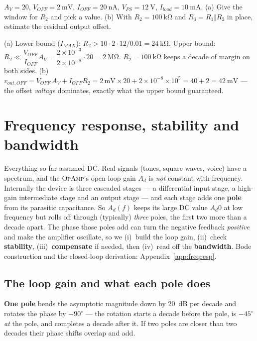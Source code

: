 \documentclass[11pt,a4paper,oneside]{book}
\newcommand{\Ad}{A_d}
\newcommand{\op}{\textsc{OpAmp}}
\begin{document}
\begin{exercise}
$A_V=20$, $V_{\!OFF}=\qty{2}{\milli\volt}$, $I_{\!OFF}=\qty{20}{\nano\ampere}$,
$V_{PS}=\qty{12}{\volt}$, $I_{load}=\qty{10}{\milli\ampere}$.
(a) Give the window for $R_2$ and pick a value. (b) With
$R_2=\qty{100}{\kilo\ohm}$ and $R_3=R_1\Vert R_2$ in place, estimate the
residual output offset.
\end{exercise}
\begin{solution}
(a) Lower bound ($I_{MAX}$): $R_2>10\cdot2\cdot12/0.01=\qty{24}{\kilo\ohm}$.
Upper bound: $R_2\ll\dfrac{V_{\!OFF}}{I_{\!OFF}}A_V
=\dfrac{2\times10^{-3}}{2\times10^{-8}}\cdot20=\qty{2}{\mega\ohm}$.
$R_2=\qty{100}{\kilo\ohm}$ keeps a decade of margin on both sides.
(b) $v_{out,OFF}=V_{\!OFF}\,A_V+I_{\!OFF}R_2
=2\,\text{mV}\times20+2\times10^{-8}\times10^{5}
=40+2=\qty{42}{\milli\volt}$ --- the offset \emph{voltage} dominates, exactly
what the upper bound guaranteed.
\end{solution}

\chapter{Frequency response, stability and bandwidth}\label{ch:freq}

Everything so far assumed DC. Real signals (tones, square waves, voice) have a
spectrum, and the \op{}'s open-loop gain $\Ad$ is \emph{not} constant with
frequency. Internally the device is three cascaded stages --- a differential
input stage, a high-gain intermediate stage and an output stage --- and each
stage adds one \textbf{pole} from its parasitic capacitance. So $\Ad(f)$ keeps
its large DC value $\Ad0$ at low frequency but rolls off through (typically)
\emph{three} poles, the first two more than a decade apart. The phase those poles
add can turn the negative feedback \emph{positive} and make the amplifier
oscillate, so we (i)~build the loop gain, (ii)~check \textbf{stability},
(iii)~\textbf{compensate} if needed, then (iv)~read off the \textbf{bandwidth}.
Bode construction and the closed-loop derivation: Appendix~\ref{app:freqresp}.

\section{The loop gain and what each pole does}
\textbf{One pole} bends the asymptotic magnitude down by \qty{20}{\dB} per decade
and rotates the phase by $-90^\circ$ --- the rotation starts a decade before the
pole, is $-45^\circ$ \emph{at} the pole, and completes a decade after it. If two
poles are closer than two decades their phase shifts overlap and add.
\end{document}

